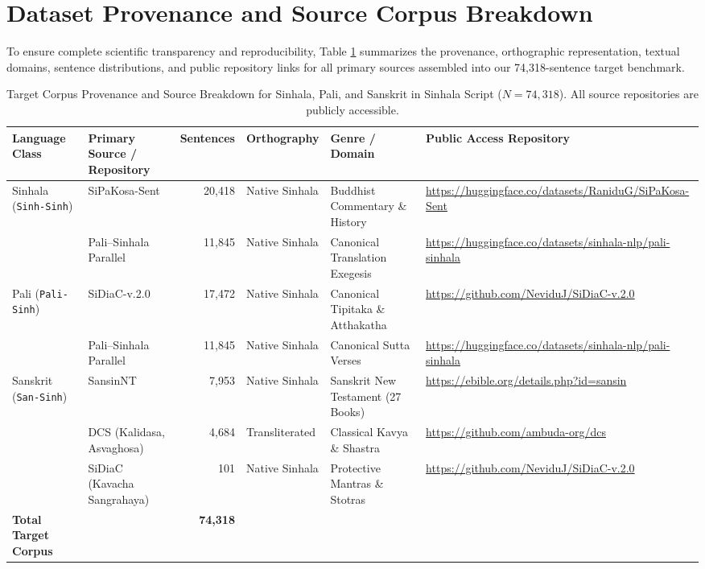 \documentclass[11pt]{article}
\begin{document}
\section{Dataset Provenance and Source Corpus Breakdown}
\label{sec:appendix_data_provenance}

To ensure complete scientific transparency and reproducibility, Table \ref{tab:dataset_provenance} summarizes the provenance, orthographic representation, textual domains, sentence distributions, and public repository links for all primary sources assembled into our 74,318-sentence target benchmark.

\begin{table}[t]
\centering
\small
\caption{Target Corpus Provenance and Source Breakdown for Sinhala, Pali, and Sanskrit in Sinhala Script ($N=74,318$). All source repositories are publicly accessible.}
\label{tab:dataset_provenance}
\begin{tabular}{llrlll}
\toprule
\textbf{Language Class} & \textbf{Primary Source / Repository} & \textbf{Sentences} & \textbf{Orthography} & \textbf{Genre / Domain} & \textbf{Public Access Repository} \\
\midrule
\multirow{2}{*}{Sinhala (\texttt{Sinh-Sinh})} 
& SiPaKosa-Sent & 20,418 & Native Sinhala & Buddhist Commentary \& History & \url{https://huggingface.co/datasets/RaniduG/SiPaKosa-Sent} \\
& Pali--Sinhala Parallel & 11,845 & Native Sinhala & Canonical Translation Exegesis & \url{https://huggingface.co/datasets/sinhala-nlp/pali-sinhala} \\
\midrule
\multirow{2}{*}{Pali (\texttt{Pali-Sinh})} 
& SiDiaC-v.2.0 & 17,472 & Native Sinhala & Canonical Tipitaka \& Atthakatha & \url{https://github.com/NeviduJ/SiDiaC-v.2.0} \\
& Pali--Sinhala Parallel & 11,845 & Native Sinhala & Canonical Sutta Verses & \url{https://huggingface.co/datasets/sinhala-nlp/pali-sinhala} \\
\midrule
\multirow{3}{*}{Sanskrit (\texttt{San-Sinh})} 
& SansinNT & 7,953 & Native Sinhala & Sanskrit New Testament (27 Books) & \url{https://ebible.org/details.php?id=sansin} \\
& DCS (Kalidasa, Asvaghosa) & 4,684 & Transliterated & Classical Kavya \& Shastra & \url{https://github.com/ambuda-org/dcs} \\
& SiDiaC (Kavacha Sangrahaya) & 101 & Native Sinhala & Protective Mantras \& Stotras & \url{https://github.com/NeviduJ/SiDiaC-v.2.0} \\
\midrule
\textbf{Total Target Corpus} & & \textbf{74,318} & & & \\
\bottomrule
\end{tabular}
\end{table}
\end{document}
